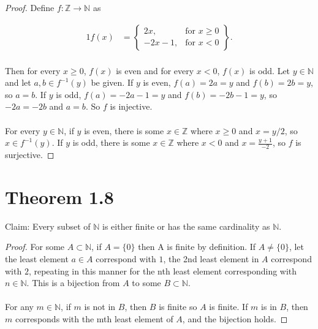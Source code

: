 \documentclass{article}
\begin{document}
\begin{proof}
    Define $f:\mathbb{Z} \rightarrow \mathbb{N}$ as 

    \begin{alignat*}{1}
    f(x) &= \left\{ 
        \begin{array}{lr}
            2x, & \text{for } x \geq 0 \\ 
            -2x-1, & \text{for } x < 0 
        \end{array}
    \right\}. \\ 
    \end{alignat*}

Then for every $x \geq 0$, $f(x)$ is even and for every $x < 0$, $f(x)$ is odd.  
Let $y \in \mathbb{N}$ and let $a, b \in f^{-1}(y)$ be given.  If $y$ is even, 
$f(a) = 2a = y$ and $f(b) = 2b = y$, so $a = b$.  If $y$ is odd, $f(a) = -2a -1 = y$ 
and $f(b) = -2b - 1 = y$, so $-2a = -2b$ and $a = b$.  So $f$ is injective. \\ 
\\
For every $y \in \mathbb{N}$, if $y$ is even, there is some $x \in \mathbb{Z}$ where  
$x \geq 0$ and $x = y/2$, so $x \in f^{-1}(y)$.  If $y$ is odd, there is some 
$x \in \mathbb{Z}$ where $x < 0$ and $x = \frac{y + 1}{-2}$, so $f$ is surjective.
\end{proof}

\section*{Theorem 1.8}

Claim: Every subset of $\mathbb{N}$ is either finite or has the same cardinality as 
$\mathbb{N}$. 

\begin{proof}
    For some $A \subset \mathbb{N}$, if $A = \{0\}$ then A is finite by definition.  If 
    $A \neq \{0\}$, let the least element $a \in A$ correspond with $1$, the 2nd least 
    element in $A$ correspond with $2$, repeating in this manner for the nth least element 
    corresponding with $n \in \mathbb{N}$.  This is a bijection from $A$ to some $B \subset \mathbb{N}$.\\ 
    \\ 
    For any $m \in \mathbb{N}$, if $m$ is not in $B$, then $B$ is finite so $A$ is finite.  
    If $m$ is in $B$, then $m$ corresponds with the mth least element of $A$, and the 
    bijection holds.
\end{proof}


\newpage 
\end{document}
